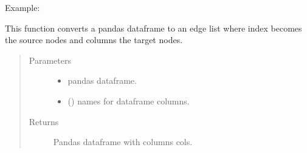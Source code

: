\documentclass[letterpaper,10pt,english]{sphinxmanual}
\begin{document}
\begin{fulllineitems}
\begin{quote}
\begin{description}
\end{description}\end{quote}

Example:

\begin{sphinxVerbatim}[commandchars=\\\{\}]
      
\end{sphinxVerbatim}

\end{fulllineitems}


\begin{fulllineitems}
\label{\detokenize{_autosummary/analytics_core.analytics:analytics_core.analytics.analytics.convertToEdgeList}}
This function converts a pandas dataframe to an edge list where index becomes the source nodes and columns the target nodes.
\begin{quote}\begin{description}
\item[{Parameters}] \leavevmode\begin{itemize}
\item {} 
 \textendash{} pandas dataframe.

\item {} 
 () \textendash{} names for dataframe columns.

\end{itemize}

\item[{Returns}] \leavevmode
Pandas dataframe with columns cols.

\end{description}\end{quote}

\end{fulllineitems}
\end{document}
